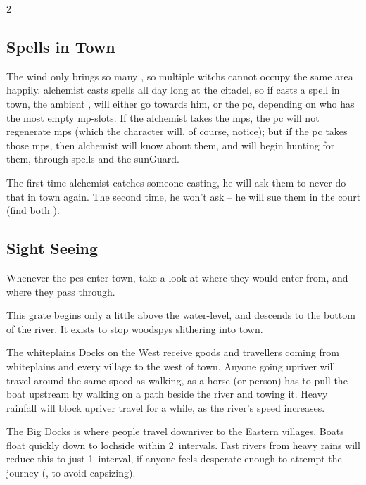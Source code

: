 \begin{multicols}{2}

\townMap

\subsection{Spells in Town}

The wind only brings so many , so multiple \glspl{witch} cannot occupy the same area happily.
\Gls{alchemist} casts spells all day long at the citadel, so if  casts a spell in town, the ambient , will either go towards him, or the \gls{pc}, depending on who has the most empty \gls{mp}-slots.
If the \gls{alchemist} takes the \glspl{mp}, the \gls{pc} will not regenerate \glspl{mp} (which the character will, of course, notice); but if the \gls{pc} takes those \glspl{mp}, then \gls{alchemist} will know about them, and will begin hunting for them, through spells and the \gls{sunGuard}.

The first time \gls{alchemist} catches someone \gls{casting}, he will ask them to never do that in town again.
The second time, he won't ask -- he will sue them in the \gls{court} (find both ).%

\subsection{Sight Seeing}

Whenever the \glspl{pc} enter \gls{town}, take a look at where they would enter from, and where they pass through.


This grate begins only a little above the water-level, and descends to the bottom of the river.
It exists to stop \glspl{woodspy} slithering into \gls{town}.


The \gls{whiteplains} Docks on the West receive goods and travellers coming from \gls{whiteplains} and every \gls{village} to the west of \gls{town}.
Anyone going upriver will travel around the same speed as walking, as a horse (or person) has to pull the boat upstream by walking on a path beside the river and towing it.
Heavy rainfall will block upriver travel for a while, as the river's speed increases.

The Big Docks is where people travel downriver to the Eastern \glspl{village}.
Boats float quickly down to \gls{lochside} within 2~\glspl{interval}.
Fast rivers from heavy rains will reduce this to just 1~\gls{interval}, if anyone feels desperate enough to attempt the journey (, \tn[12] to avoid capsizing).


\end{multicols}
